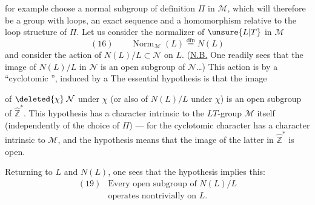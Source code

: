 
for example choose a normal subgroup of definition $\Pi$ in $\mathcal{M}$, which will therefore be a group with loops,  an exact sequence
and a homomorphism
relative to the loop structure of $\Pi$. Let us consider the normalizer of $\unsure{L|T}$ in $\mathcal{M}$
\[
(16)\qquad \operatorname{Norm}_{\mathcal{M}}(L)\overset{\mathrm{dfn}}{=}N(L)
\]
and consider the action of $N(L)/L\subset\mathcal{N}$  on $L$. (\uline{N.B.} One readily sees that the image of $N(L)/L$ in $\mathcal{N}$ is an open subgroup of $\mathcal{N}$\ldots) This action is by a ``cyclotomic '', induced by a 
The essential hypothesis is that the image


of $\deleted{\chi}\;\mathcal{N}$ under $\chi$ (or also of $N(L)/L$ under $\chi$) is an open subgroup of $\widehat{\mathbb{Z}}^{*}$. This hypothesis has a character intrinsic to the $LT$-group $\mathcal{M}$ itself (independently of the choice of $\Pi$) --- for the cyclotomic character
has a character intrinsic to $\mathcal{M}$, and the hypothesis means that the image of the latter in $\widehat{\mathbb{Z}}^{*}$ is open.

Returning to $L$ and $N(L)$, one sees that the hypothesis  implies this:
\[
\begin{array}{ll}
(19)&\text{Every open subgroup of }N(L)/L\\
&\text{operates nontrivially on }L.
\end{array}
\]

